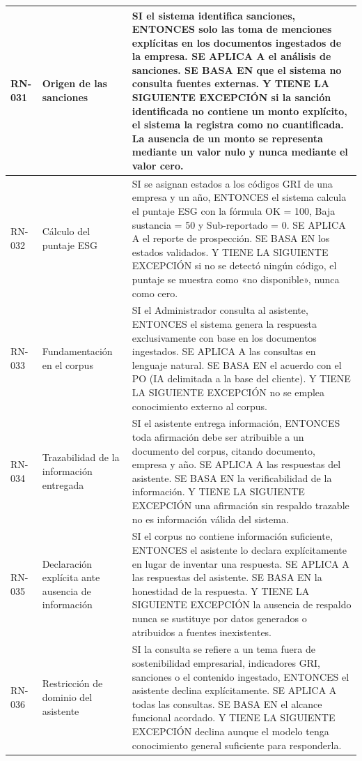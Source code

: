 \begin{longtable}{|C{1.4cm}|L{4.0cm}|L{9.4cm}|}
\hline
RN-031 & Origen de las sanciones & SI el sistema identifica sanciones, ENTONCES solo las toma de menciones explícitas en los documentos ingestados de la empresa. SE APLICA A el análisis de sanciones. SE BASA EN que el sistema no consulta fuentes externas. Y TIENE LA SIGUIENTE EXCEPCIÓN si la sanción identificada no contiene un monto explícito, el sistema la registra como no cuantificada. La ausencia de un monto se representa mediante un valor nulo y nunca mediante el valor cero. \\
\hline
RN-032 & Cálculo del puntaje ESG & SI se asignan estados a los códigos GRI de una empresa y un año, ENTONCES el sistema calcula el puntaje ESG con la fórmula OK = 100, Baja sustancia = 50 y Sub-reportado = 0. SE APLICA A el reporte de prospección. SE BASA EN los estados validados. Y TIENE LA SIGUIENTE EXCEPCIÓN si no se detectó ningún código, el puntaje se muestra como «no disponible», nunca como cero. \\
\hline
RN-033 & Fundamentación en el corpus & SI el Administrador consulta al asistente, ENTONCES el sistema genera la respuesta exclusivamente con base en los documentos ingestados. SE APLICA A las consultas en lenguaje natural. SE BASA EN el acuerdo con el PO (IA delimitada a la base del cliente). Y TIENE LA SIGUIENTE EXCEPCIÓN no se emplea conocimiento externo al corpus. \\
\hline
RN-034 & Trazabilidad de la información entregada & SI el asistente entrega información, ENTONCES toda afirmación debe ser atribuible a un documento del corpus, citando documento, empresa y año. SE APLICA A las respuestas del asistente. SE BASA EN la verificabilidad de la información. Y TIENE LA SIGUIENTE EXCEPCIÓN una afirmación sin respaldo trazable no es información válida del sistema. \\
\hline
RN-035 & Declaración explícita ante ausencia de información & SI el corpus no contiene información suficiente, ENTONCES el asistente lo declara explícitamente en lugar de inventar una respuesta. SE APLICA A las respuestas del asistente. SE BASA EN la honestidad de la respuesta. Y TIENE LA SIGUIENTE EXCEPCIÓN la ausencia de respaldo nunca se sustituye por datos generados o atribuidos a fuentes inexistentes. \\
\hline
RN-036 & Restricción de dominio del asistente & SI la consulta se refiere a un tema fuera de sostenibilidad empresarial, indicadores GRI, sanciones o el contenido ingestado, ENTONCES el asistente declina explícitamente. SE APLICA A todas las consultas. SE BASA EN el alcance funcional acordado. Y TIENE LA SIGUIENTE EXCEPCIÓN declina aunque el modelo tenga conocimiento general suficiente para responderla. \\

\end{longtable}
